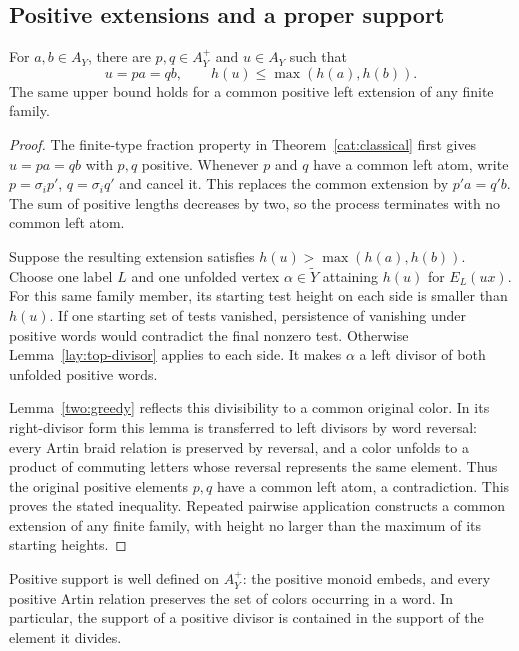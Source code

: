 \subsection{Positive extensions and a proper support}

\begin{lemma}\label{sph:common-extension}
For \(a,b\in A_Y\), there are \(p,q\in A_Y^+\) and
\(u\in A_Y\) such that
\[
 u=pa=qb,\qquad h(u)\leq\max(h(a),h(b)).
\]
The same upper bound holds for a common positive
left extension of any finite family.
\end{lemma}

\begin{proof}
The finite-type fraction property in
Theorem~\ref{cat:classical} first gives \(u=pa=qb\)
with \(p,q\) positive.  Whenever \(p\) and \(q\)
have a common left atom, write
\(p=\sigma_i p'\), \(q=\sigma_i q'\) and cancel it.
This replaces the common extension by
\(p'a=q'b\).
The sum of positive lengths decreases by two, so
the process terminates with no common left atom.

Suppose the resulting extension satisfies
\(h(u)>\max(h(a),h(b))\).
Choose one label \(L\) and one unfolded vertex
\(\alpha\in\widetilde Y\) attaining \(h(u)\) for
\(E_L(ux)\).
For this same family member, its starting test
height on each side is smaller than \(h(u)\).
If one starting set of tests vanished, persistence
of vanishing under positive words would contradict
the final nonzero test.  Otherwise
Lemma~\ref{lay:top-divisor} applies to each side.
It makes \(\alpha\) a left divisor of both unfolded
positive words.

Lemma~\ref{two:greedy} reflects this divisibility
to a common original color.  In its right-divisor
form this lemma is transferred to left divisors
by word reversal: every Artin braid relation is
preserved by reversal, and a color unfolds to a
product of commuting letters whose reversal
represents the same element.
Thus the original positive elements \(p,q\) have
a common left atom, a contradiction.
This proves the stated inequality.
Repeated pairwise application constructs a common
extension of any finite family, with height no
larger than the maximum of its starting heights.
\end{proof}

Positive support is well defined on \(A_Y^+\):
the positive monoid embeds, and every positive
Artin relation preserves the set of colors
occurring in a word.  In particular, the support
of a positive divisor is contained in the support
of the element it divides.

